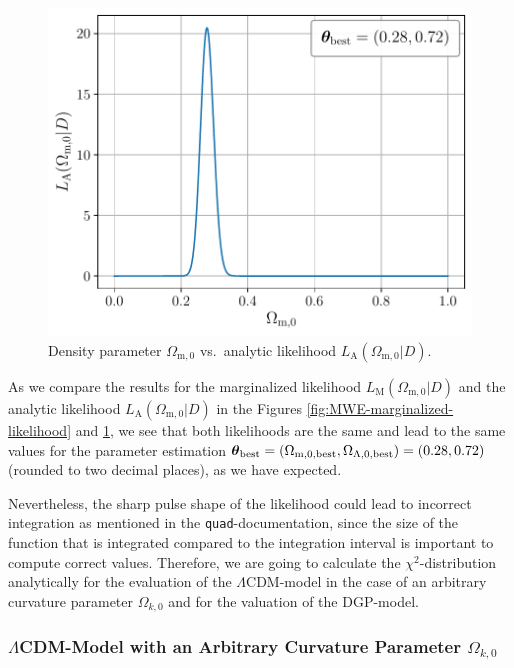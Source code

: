 \begin{figure}[H]
\begin{minipage}{8cm}
        \includegraphics[scale=0.52]{figures/plots/PDF/MWE-analytic-likelihood.pdf}
        \caption{Density parameter $\Omega_{\text{m},0}$ vs.\ analytic likelihood $L_{\text{A}}(\Omega_{\text{m},0} \vert D)$.}
        \label{fig:MWE-analytic-likelihood}
    \end{minipage}
\end{figure}

\noindent As we compare the results for the marginalized likelihood $L_{\text{M}}(\Omega_{\text{m}, 0} \vert D)$ and the analytic likelihood $L_{\text{A}}(\Omega_{\text{m}, 0} \vert D)$ in the Figures \ref{fig:MWE-marginalized-likelihood} and \ref{fig:MWE-analytic-likelihood}, we see that both likelihoods are the same and lead to the same values for the parameter estimation $\vb*{\theta}_{\text{best}} = (\Omega_{\text{m}, 0, \text{best}}, \Omega_{\Lambda, 0, \text{best}}) = (0.28, 0.72)$ (rounded to two decimal places), as we have expected.

\noindent Nevertheless, the sharp pulse shape of the likelihood could lead to incorrect integration as mentioned in the \colorbox{backcolor}{\lstinline{quad}}-documentation, since the size of the function that is integrated compared to the integration interval is important to compute correct values. Therefore, we are going to calculate the $\chi^{2}$-distribution analytically for the evaluation of the $\Lambda$CDM-model in the case of an arbitrary curvature parameter $\Omega_{k,0}$ and for the valuation of the DGP-model.


\subsubsection{$\Lambda$CDM-Model with an Arbitrary Curvature Parameter $\Omega_{k,0}$}


